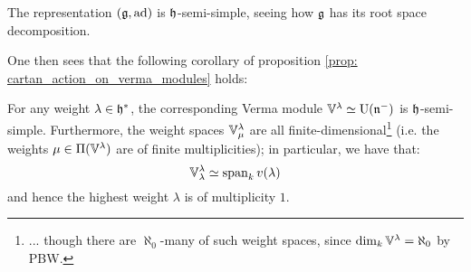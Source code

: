         \begin{example}
            The representation $(\mathfrak{g}, \mathrm{ad})$ is $\mathfrak{h}$-semi-simple, seeing how $\mathfrak{g}$ has its root space decomposition. 
        \end{example}
        One then sees that the following corollary of proposition \ref{prop: cartan_action_on_verma_modules} holds:
        \begin{corollary} \label{coro: verma_modules_are_cartan_semi_simple}
            For any weight $\lambda \in \mathfrak{h}^*$, the corresponding Verma module $\mathbb{V}^{\lambda} \simeq \mathrm{U}(\mathfrak{n}^-)$ is $\mathfrak{h}$-semi-simple. Furthermore, the weight spaces $\mathbb{V}^{\lambda}_{\mu}$ are all finite-dimensional\footnote{... though there are $\aleph_0$-many of such weight spaces, since $\dim_k \mathbb{V}^{\lambda} = \aleph_0$ by PBW.} (i.e. the weights $\mu \in \Pi(\mathbb{V}^{\lambda})$ are of finite multiplicities); in particular, we have that:
                $$\mathbb{V}^{\lambda}_{\lambda} \simeq \operatorname{span}_k v(\lambda)$$
            and hence the highest weight $\lambda$ is of multiplicity $1$. 
        \end{corollary}
            
